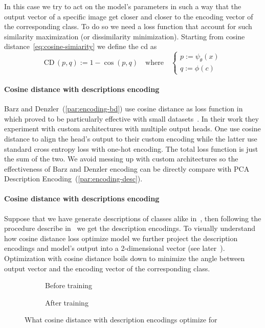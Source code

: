 In this case we try to act on the model's parameters in such a way that the
output vector of a specific image get closer and closer to the encoding vector
of the corresponding class. To do so we need a loss function that account for
such similarity maximization (or dissimilarity minimization). Starting from
cosine distance~\eqref{eq:cosine-simiarity} we define the \acrfull{cd} as
\begin{equation}
  \textrm{CD} \, (p, q) := 1 - \cos (p, q)
  \label{eq:cosine-distance}
  \quad \textrm{where} \quad
  \begin{cases}
    p := \psi_\theta(x) \\
    q := \phi(c)
  \end{cases}
\end{equation}

\paragraph{Cosine distance with descriptions encoding} Barz and
Denzler~(\ref{par:encoding-bd}) use cosine distance as loss function
in~\cite{HierarchyBasedBarz2018} which proved to be particularly effective with
small datasets~\cite{DeepLearningOBarz2019}. In their work they experiment with
custom architectures with multiple output heads. One use cosine distance to
align the head's output to their custom encoding while the latter use standard
cross entropy loss with one-hot encoding. The total loss function is just the
sum of the two. We avoid messing up with custom architectures so the
effectiveness of Barz and Denzler encoding can be directly compare with PCA
Description Encoding~(\ref{par:encoding-desc}).

\paragraph{Cosine distance with descriptions encoding} Suppose that we have
generate descriptions of classes alike in~, then
following the procedure describe in~ we get the
description encodings. To visually understand how cosine distance loss optimize
model we further project the description encodings and model's output  into a
2-dimensional vector (see later~).
Optimization with cosine distance boils down to minimize the angle between
output vector and the encoding vector of the corresponding class.
\begin{figure}[htbp]
  \begin{subfigure}{0.45\textwidth}
    \caption{Before training}
    \label{fig:03/cd-desc-before}
  \end{subfigure}
  \begin{subfigure}{0.45\textwidth}
    \caption{After training}
    \label{fig:03/cd-desc-after}
  \end{subfigure}
  \caption{What cosine distance with description encodings optimize for}
\end{figure}
